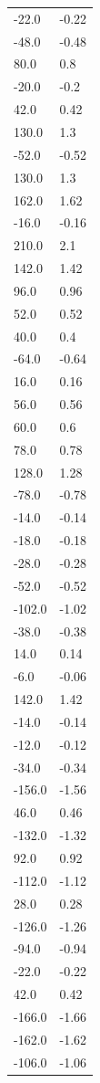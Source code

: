 \begin{longtable}{ll}
-22.0 & -0.22 \\
-48.0 & -0.48 \\
80.0 & 0.8 \\
-20.0 & -0.2 \\
42.0 & 0.42 \\
130.0 & 1.3 \\
-52.0 & -0.52 \\
130.0 & 1.3 \\
162.0 & 1.62 \\
-16.0 & -0.16 \\
210.0 & 2.1 \\
142.0 & 1.42 \\
96.0 & 0.96 \\
52.0 & 0.52 \\
40.0 & 0.4 \\
-64.0 & -0.64 \\
16.0 & 0.16 \\
56.0 & 0.56 \\
60.0 & 0.6 \\
78.0 & 0.78 \\
128.0 & 1.28 \\
-78.0 & -0.78 \\
-14.0 & -0.14 \\
-18.0 & -0.18 \\
-28.0 & -0.28 \\
-52.0 & -0.52 \\
-102.0 & -1.02 \\
-38.0 & -0.38 \\
14.0 & 0.14 \\
-6.0 & -0.06 \\
142.0 & 1.42 \\
-14.0 & -0.14 \\
-12.0 & -0.12 \\
-34.0 & -0.34 \\
-156.0 & -1.56 \\
46.0 & 0.46 \\
-132.0 & -1.32 \\
92.0 & 0.92 \\
-112.0 & -1.12 \\
28.0 & 0.28 \\
-126.0 & -1.26 \\
-94.0 & -0.94 \\
-22.0 & -0.22 \\
42.0 & 0.42 \\
-166.0 & -1.66 \\
-162.0 & -1.62 \\
-106.0 & -1.06 \\

\end{longtable}
